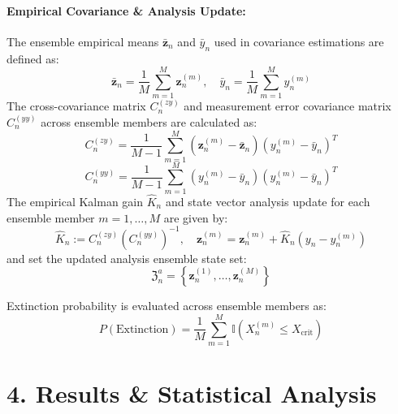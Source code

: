 \documentclass[11pt,a4paper]{article}
\begin{document}
\paragraph{Empirical Covariance \& Analysis Update:}
The ensemble empirical means $\bar{\mathbf{z}}_n$ and $\bar{y}_n$ used in covariance estimations are defined as:
\begin{equation}
\bar{\mathbf{z}}_n = \frac{1}{M} \sum_{m=1}^M \mathbf{z}_n^{(m)}, \quad \bar{y}_n = \frac{1}{M} \sum_{m=1}^M y_n^{(m)}
\end{equation}
The cross-covariance matrix $C_n^{(zy)}$ and measurement error covariance matrix $C_n^{(yy)}$ across ensemble members are calculated as:
\begin{equation}
C_n^{(zy)} = \frac{1}{M-1} \sum_{m=1}^M \left(\mathbf{z}_n^{(m)} - \bar{\mathbf{z}}_n\right) \left(y_n^{(m)} - \bar{y}_n\right)^T
\end{equation}
\begin{equation}
C_n^{(yy)} = \frac{1}{M-1} \sum_{m=1}^M \left(y_n^{(m)} - \bar{y}_n\right) \left(y_n^{(m)} - \bar{y}_n\right)^T
\end{equation}
The empirical Kalman gain $\hat{K}_n$ and state vector analysis update for each ensemble member $m = 1, \dots, M$ are given by:
\begin{equation}
\hat{K}_n := C_n^{(zy)} \left(C_n^{(yy)}\right)^{-1}, \quad \mathbf{z}_n^{(m)} = \mathbf{z}_n^{(m)} + \hat{K}_n \left(y_n - y_n^{(m)}\right)
\end{equation}
and set the updated analysis ensemble state set:
\begin{equation}
\mathfrak{Z}_n^a = \left\{ \mathbf{z}_n^{(1)}, \dots, \mathbf{z}_n^{(M)} \right\}
\end{equation}

Extinction probability is evaluated across ensemble members as:
\begin{equation}
P(\text{Extinction}) = \frac{1}{M} \sum_{m=1}^M \mathbb{I}\left(X_n^{(m)} \le X_{\text{crit}}\right)
\end{equation}

\section*{4. Results \& Statistical Analysis}
\end{document}
